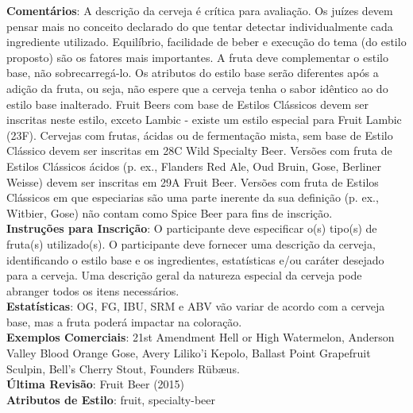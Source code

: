 \textbf{Comentários}: A descrição da cerveja é crítica para avaliação. Os juízes devem pensar mais no conceito declarado do que tentar detectar individualmente cada ingrediente utilizado. Equilíbrio, facilidade de beber e execução do tema (do estilo proposto) são os fatores mais importantes. A fruta deve complementar o estilo base, não sobrecarregá-lo. Os atributos do estilo base serão diferentes após a adição da fruta, ou seja, não espere que a cerveja tenha o sabor idêntico ao do estilo base inalterado. Fruit Beers com base de Estilos Clássicos devem ser inscritas neste estilo, exceto Lambic - existe um estilo especial para Fruit Lambic (23F). Cervejas com frutas, ácidas ou de fermentação mista, sem base de Estilo Clássico devem ser inscritas em 28C Wild Specialty Beer. Versões com fruta de Estilos Clássicos ácidos (p. ex., Flanders Red Ale, Oud Bruin, Gose, Berliner Weisse) devem ser inscritas em 29A Fruit Beer. Versões com fruta de Estilos Clássicos em que especiarias são uma parte inerente da sua definição (p. ex., Witbier, Gose) não contam como Spice Beer para fins de inscrição. \\
\textbf{Instruções para Inscrição}: O participante deve especificar o(s) tipo(s) de fruta(s) utilizado(s). O participante deve fornecer uma descrição da cerveja, identificando o estilo base e os ingredientes, estatísticas e/ou caráter desejado para a cerveja. Uma descrição geral da natureza especial da cerveja pode abranger todos os itens necessários. \\
\textbf{Estatísticas}: OG, FG, IBU, SRM e ABV vão variar de acordo com a cerveja base, mas a fruta poderá impactar na coloração. \\
\textbf{Exemplos Comerciais}: 21st Amendment Hell or High Watermelon, Anderson Valley Blood Orange Gose, Avery Liliko'i Kepolo, Ballast Point Grapefruit Sculpin, Bell's Cherry Stout, Founders Rübæus. \\
\textbf{Última Revisão}: Fruit Beer (2015) \\
\textbf{Atributos de Estilo}: fruit, specialty-beer
